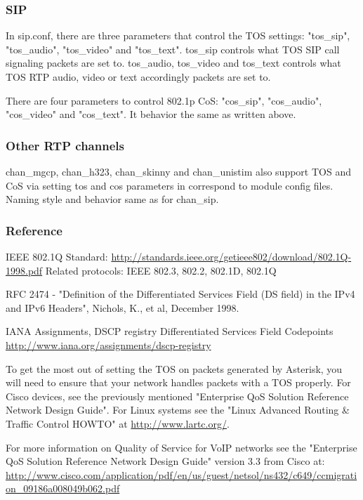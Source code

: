 \subsubsection{SIP}

In sip.conf, there are three parameters that control the TOS settings:
"tos\_sip", "tos\_audio", "tos\_video" and "tos\_text". tos\_sip controls
what TOS SIP call signaling packets are set to. tos\_audio, tos\_video
and tos\_text controls what TOS RTP audio, video or text accordingly
packets are set to.

There are four parameters to control 802.1p CoS: "cos\_sip", "cos\_audio",
"cos\_video" and "cos\_text". It behavior the same as written above.

\subsubsection{Other RTP channels}

chan\_mgcp, chan\_h323, chan\_skinny and chan\_unistim also support TOS and
CoS via setting tos and cos parameters in correspond to module config 
files. Naming style and behavior same as for chan\_sip.

\subsubsection{Reference}

IEEE 802.1Q Standard:
\url{http://standards.ieee.org/getieee802/download/802.1Q-1998.pdf}
Related protocols: IEEE 802.3, 802.2, 802.1D, 802.1Q

RFC 2474 - "Definition of the Differentiated Services Field
(DS field) in the IPv4 and IPv6 Headers", Nichols, K., et al,
December 1998.

IANA Assignments, DSCP registry
Differentiated Services Field Codepoints
\url{http://www.iana.org/assignments/dscp-registry}

To get the most out of setting the TOS on packets generated by
Asterisk, you will need to ensure that your network handles packets
with a TOS properly.  For Cisco devices, see the previously mentioned
"Enterprise QoS Solution Reference Network Design Guide".  For Linux
systems see the "Linux Advanced Routing \& Traffic Control HOWTO" at 
\url{http://www.lartc.org/}.

For more information on Quality of
Service for VoIP networks see the "Enterprise QoS Solution Reference
Network Design Guide" version 3.3 from Cisco at:
\url{http://www.cisco.com/application/pdf/en/us/guest/netsol/ns432/c649/ccmigration\_09186a008049b062.pdf}
